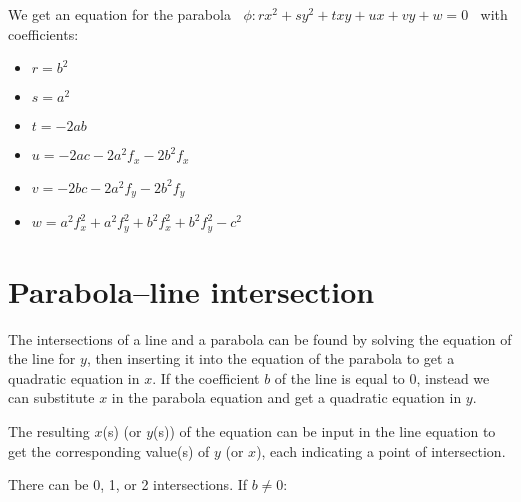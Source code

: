 \documentclass[11pt,a4paper,english]{article}
\begin{document}
	We get an equation for the parabola \(\;\;
		\phi : rx^{2} + sy^{2} + txy + ux + vy + w = 0
	\;\;\)
	with coefficients:

	\begin{itemize}[label=\(\triangleright\)]\setlength{\itemsep}{-2pt}
    \item \(r = b^{2}\)
    \item \(s = a^{2}\)
    \item \(t = -2ab\)
    \item \(u = -2ac-2a^{2}f_{x}-2b^{2}f_{x}\)
    \item \(v = -2bc-2a^{2}f_{y}-2b^{2}f_{y}\)
    \item \(w = a^{2}f_{x}^{2} + a^{2}f_{y}^{2} + b^{2}f_{x}^{2} + b^{2}f_{y}^{2} - c^{2}\)
    \end{itemize}
    
    \newpage
    
    \section*{Parabola--line intersection}
    The intersections of a line and a parabola can be found by solving the equation of the line for \(y\), then inserting it into the equation of the parabola to get a quadratic equation in \(x\). If the coefficient \(b\) of the line is equal to 0, instead we can substitute \(x\) in the parabola equation and get a quadratic equation in \(y\).\par
    The resulting \(x\)(s) (or \(y\)(s)) of the equation can be input in the line equation to get the corresponding value(s) of \(y\) (or \(x\)), each indicating a point of intersection.\par
    There can be 0, 1, or 2 intersections.
    \ppar
    If \(b \neq 0\):
    
\end{document}
